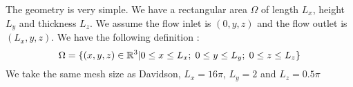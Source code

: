 The geometry is very simple. We have a rectangular area $\Omega$ of length $L_x$, height $L_y$ and thickness $L_z$. We assume the flow inlet is $(0,y,z)$ and the flow outlet is$(L_x,y,z)$. We have the following definition :
\[
\Omega = \{(x,y,z) \in \mathbb{R}^3 | 0 \leq x \leq L_x; \hspace{0.1cm} 0 \leq y \leq L_y; \hspace{0.1cm} 0 \leq z \leq L_z\}
\]
We take the same mesh size as Davidson, $L_x = 16 \pi$, $L_y = 2$ and $L_z = 0.5\pi$\\
